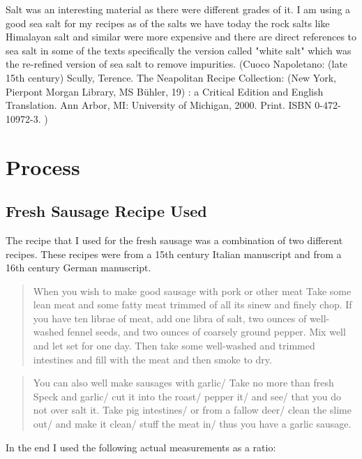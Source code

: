 \documentclass[letterpaper,11pt,leqno]{article}
\begin{document}
Salt was an interesting material as there were different grades of it. I am using a good sea salt for my recipes as of the salts we have today the rock salts like Himalayan salt and similar were more expensive and there are direct references to sea salt in some of the texts specifically the version called "white salt" which was the re-refined version of sea salt to remove impurities. (Cuoco Napoletano: (late 15th century) Scully, Terence.  The Neapolitan Recipe Collection: (New York, Pierpont Morgan Library, MS B{\"u}hler, 19) : a Critical Edition and English Translation.  Ann Arbor, MI: University of Michigan, 2000.  Print.  ISBN 0-472-10972-3. )

\appendix

\section{Process}\label{a:appendix1}

\subsection{Fresh Sausage Recipe Used}

The recipe that I used for the fresh sausage was a combination of two different recipes. These recipes were from a 15th century Italian manuscript and from a 16th century German manuscript.

\begin{quote}
	When you wish to make good sausage with pork or other meat
	Take some lean meat and some fatty meat trimmed of all its sinew and finely chop.  If you have ten librae of meat, add one libra of salt, two ounces of well-washed fennel seeds, and two ounces of coarsely ground pepper.  Mix well and let set for one day.  Then take some well-washed and trimmed intestines and fill with the meat and then smoke to dry. \citep{martino2005art}
\end{quote}

\begin{quote}
	You can also well make sausages with garlic/ Take no more than fresh Speck and garlic/ cut it into the roast/ pepper it/ and see/ that you do not over salt it.  Take pig intestines/ or from a fallow deer/ clean the slime out/ and make it clean/ stuff the meat in/ thus you have a garlic sausage. \citep{rumpolt1980new}
\end{quote}

In the end I used the following actual measurements as a ratio:
\end{document}
